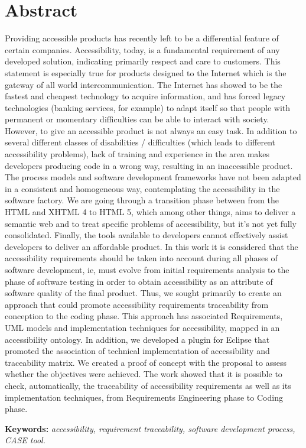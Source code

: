 \chapter*{Abstract}

Providing accessible products has recently left  to be a differential
feature of certain companies. Accessibility, today, is a fundamental requirement
of any developed solution, indicating primarily respect and care to
customers.
This statement is especially true for products designed to the Internet which is
the gateway of all  world intercommunication. The Internet has showed to be the
fastest and cheapest technology to acquire information, and has forced legacy
technologies (banking services, for example) to adapt itself so that people with
permanent or momentary difficulties can be able to interact with society.
However, to give an accessible product is not always an easy task. In addition to several different classes of disabilities / difficulties (which leads to
different accessibility problems), lack of training and experience in the area
makes developers producing code in a wrong way, resulting in an inaccessible
product.
The process models and software development frameworks have not been adapted in a
consistent and homogeneous way, contemplating the accessibility in the software
factory. We are going through a transition phase between from the HTML and
XHTML 4 to HTML 5, which among other things, aims to deliver a semantic web and
to treat specific problems of accessibility, but it's not yet fully
consolidated.
Finally, the tools available to developers cannot effectively assist developers to
deliver an affordable product. In this work it is considered that the accessibility requirements should be taken into account during all phases of software development, ie, must evolve from initial requirements analysis to the phase of software testing in order to obtain accessibility as an attribute of software quality of the final product. Thus, we sought primarily to create an approach that could promote accessibility requirements traceability from conception to the coding phase. This approach has associated Requirements, UML models and implementation techniques for accessibility, mapped in an accessibility ontology. In addition, we developed a plugin for Eclipse that promoted the association of technical implementation of accessibility and traceability matrix. We created a proof of concept with the proposal to assess whether the objectives were achieved. The work showed that it is possible to check, automatically, the traceability of accessibility requirements as well as its implementation techniques, from Requirements Engineering phase to Coding phase.

\textbf{Keywords:} \textit{accessibility, requirement traceability,
software development process, CASE tool.}

\label{abstract}